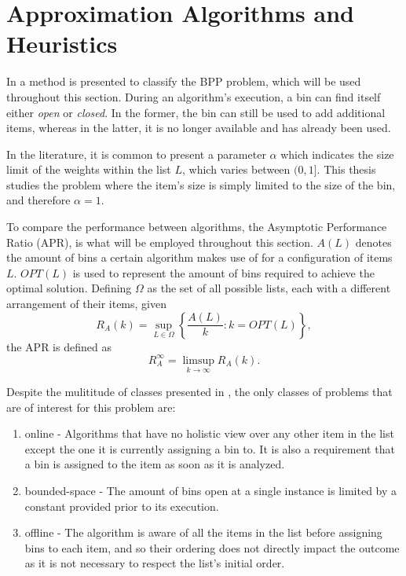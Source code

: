 \section{Approximation Algorithms and Heuristics}
\label{section:AA}

In \cite{coffman2013bin} a method is presented to classify the BPP problem,
which will be used throughout this section. During an algorithm's execution,
a bin can find itself either \textit{open} or \textit{closed}. In the former,
the bin can still be used to add additional items, whereas in the latter, it is
no longer available and has already been used.  

In the literature, it is common to present a parameter $\alpha$ which
indicates the size limit of the weights within the list $L$, which varies
between $(0, 1]$. This thesis studies the problem where the item's size is
simply limited to the size of the bin, and therefore $\alpha = 1$.

To compare the performance between algorithms, the Asymptotic Performance Ratio
(APR), is what will be employed throughout this section. $A(L)$ denotes the
amount of bins a certain algorithm makes use of for a configuration of items
$L$. $OPT(L)$ is used to represent the amount of bins required to achieve the
optimal solution. Defining $\Omega$ as the set of all possible lists, each with
a different arrangement of their items, given
\begin{equation}
    R_A (k) = \sup_{L \in \Omega} \left \{ \frac{A(L)}{k} : k = OPT(L) \right \},
\end{equation}
the APR is defined as
\begin{equation}
    R_A^\infty = \limsup_{k \to \infty} R_A(k).
\end{equation}

Despite the mulititude of classes presented in \cite{coffman2013bin}, the only
classes of problems that are of interest for this problem are: 
\begin{enumerate}
    \item online - Algorithms that have no holistic view over any other item in
        the list except the one it is currently assigning a bin to. It is also a
        requirement that a bin is assigned to the item as soon as it is
        analyzed.
    \item bounded-space - The amount of bins open at a single instance is
        limited by a constant provided prior to its execution.
    \item offline - The algorithm is aware of all the items in the list before
        assigning bins to each item, and so their ordering does not directly
        impact the outcome as it is not necessary to respect the list's initial
        order.
\end{enumerate}

